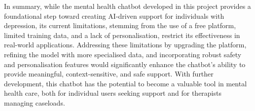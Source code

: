 In summary, while the mental health chatbot developed in this project provides a foundational step toward creating AI-driven support for individuals with depression, its current limitations, stemming from the use of a free platform, limited training data, and a lack of personalisation, restrict its effectiveness in real-world applications. Addressing these limitations by upgrading the platform, refining the model with more specialised data, and incorporating robust safety and personalisation features would significantly enhance the chatbot's ability to provide meaningful, context-sensitive, and safe support. With further development, this chatbot has the potential to become a valuable tool in mental health care, both for individual users seeking support and for therapists managing caseloads.
